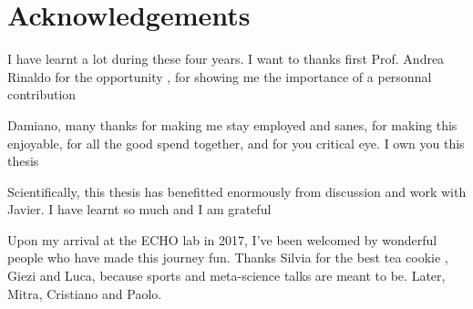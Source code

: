 




 \chapter{Acknowledgements}
 I have learnt a lot during these four years. I want to thanks first Prof. Andrea Rinaldo for the opportunity , for showing me the importance of a personnal contribution  
 
 Damiano, many thanks for making me stay employed and sanes, for making this enjoyable, for all the good spend together, and for you critical eye. I own you this thesis 
 
 Scientifically, this thesis has benefitted enormously from discussion and work with Javier. I have learnt so much and I am grateful
 
 Upon my arrival at the ECHO lab in 2017, I've been welcomed by wonderful people who have made this journey fun. Thanks Silvia for the best tea cookie , Giezi and Luca, because sports and meta-science talks are meant to be. Later, Mitra, Cristiano and Paolo.
 
